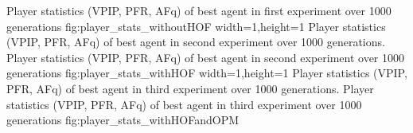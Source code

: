   {Player statistics (VPIP, PFR, AFq) of best agent in first experiment over 1000 generations}%
  {fig:player_stats_withoutHOF}%
  {width=1\textwidth,height=1\textheight}%
  {Player statistics (VPIP, PFR, AFq) of best agent in second experiment over 1000 generations.}%
  {Player statistics (VPIP, PFR, AFq) of best agent in second experiment over 1000 generations}%
  {fig:player_stats_withHOF}%
  {width=1\textwidth,height=1\textheight}%
  {Player statistics (VPIP, PFR, AFq) of best agent in third experiment over 1000 generations.}%
  {Player statistics (VPIP, PFR, AFq) of best agent in third experiment over 1000 generations}%
  {fig:player_stats_withHOFandOPM}%


